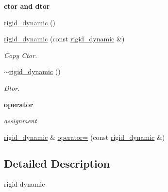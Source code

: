 \begin{Indent}{\bf ctor and dtor}\par
{\em \label{_amgrp98fbd3e5ae66fcd014fb744fec76c58d}
 }\begin{DoxyCompactItemize}
\item 
\hyperlink{classnebula_1_1content_1_1actor_1_1renderer_1_1rigid__dynamic_a1769b910cd702811d55a80c4d37b3df9}{rigid\_\-dynamic} ()
\item 
\hyperlink{classnebula_1_1content_1_1actor_1_1renderer_1_1rigid__dynamic_ac8c70a2348e70444a882d6356d921846}{rigid\_\-dynamic} (const \hyperlink{classnebula_1_1content_1_1actor_1_1renderer_1_1rigid__dynamic}{rigid\_\-dynamic} \&)
\begin{DoxyCompactList}\small\item\em Copy Ctor. \item\end{DoxyCompactList}\item 
\hyperlink{classnebula_1_1content_1_1actor_1_1renderer_1_1rigid__dynamic_a87d93301fdc8a6eb335b620f95c4c0a3}{$\sim$rigid\_\-dynamic} ()
\begin{DoxyCompactList}\small\item\em Dtor. \item\end{DoxyCompactList}\end{DoxyCompactItemize}
\end{Indent}
\begin{Indent}{\bf operator}\par
{\em \label{_amgrp4b583376b2767b923c3e1da60d10de59}
 assignment }\begin{DoxyCompactItemize}
\item 
\hyperlink{classnebula_1_1content_1_1actor_1_1renderer_1_1rigid__dynamic}{rigid\_\-dynamic} \& \hyperlink{classnebula_1_1content_1_1actor_1_1renderer_1_1rigid__dynamic_ae90eb12e9f68833bd1bf0b8360332f49}{operator=} (const \hyperlink{classnebula_1_1content_1_1actor_1_1renderer_1_1rigid__dynamic}{rigid\_\-dynamic} \&)
\end{DoxyCompactItemize}
\end{Indent}


\subsection{Detailed Description}
rigid dynamic 

